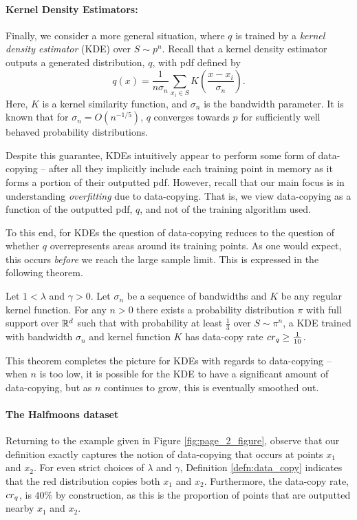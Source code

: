 \paragraph{Kernel Density Estimators:} Finally, we consider a more general situation, where $q$ is trained by a \textit{kernel density estimator} (KDE) over $S \sim p^n$. Recall that a kernel density estimator outputs a generated distribution, $q$, with pdf defined by $$q(x) = \frac{1}{n\sigma_n}\sum_{x_i \in S} K\left(\frac{x - x_i}{\sigma_n}\right).$$ Here, $K$ is a kernel similarity function, and $\sigma_n$ is the bandwidth parameter. It is known that for $\sigma_n = O(n^{-1/5})$, $q$ converges towards $p$ for sufficiently well behaved probability distributions. 

Despite this guarantee, KDEs intuitively appear to perform some form of data-copying -- after all they implicitly include each training point in memory as it forms a portion of their outputted pdf. However, recall that our main focus is in understanding \textit{overfitting} due to data-copying. That is, we view data-copying as a function of the outputted pdf, $q$, and not of the training algorithm used. 

To this end, for KDEs the question of data-copying reduces to the question of whether $q$ overrepresents areas around its training points. As one would expect, this occurs \textit{before} we reach the large sample limit. This is expressed in the following theorem.

\begin{theorem}\label{thm:KDE}
Let $1 < \lambda$ and $\gamma > 0$. Let $\sigma_n$ be a sequence of bandwidths and $K$ be any regular kernel function. For any $n > 0$ there exists a probability distribution $\pi$ with full support over $\mathbb{R}^d$ such that with probability at least $\frac{1}{3}$ over $S \sim \pi^n$, a KDE trained with bandwidth $\sigma_n$ and kernel function $K$ has data-copy rate $cr_q \geq \frac{1}{10}$.
\end{theorem}

This theorem completes the picture for KDEs with regards to data-copying -- when $n$ is too low, it is possible for the KDE to have a significant amount of data-copying, but as $n$ continues to grow, this is eventually smoothed out.

\paragraph{The Halfmoons dataset}

Returning to the example given in Figure \ref{fig:page_2_figure}, observe that our definition exactly captures the notion of data-copying that occurs at points $x_1$ and $x_2$. For even strict choices of $\lambda$ and $\gamma$, Definition \ref{defn:data_copy} indicates that the red distribution copies both $x_1$ and $x_2$. Furthermore, the data-copy rate, $cr_q$, is $40\%$ by construction, as this is the proportion of points that are outputted nearby $x_1$ and $x_2$.

